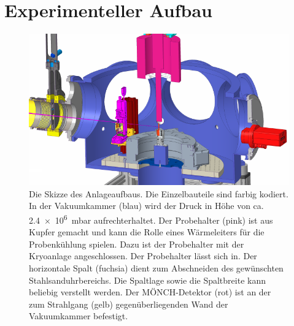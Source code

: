 \chapter{Experimenteller Aufbau}
\begin{figure}[H]
    \centering
    \includegraphics{images/aufbau/aufbau_empty.pdf}
    \caption{Die Skizze des Anlageaufbaus. Die Einzelbauteile sind farbig kodiert. In der Vakuumkammer (blau) wird der Druck in Höhe von ca. \SI{2.4e6}{\milli\bar} aufrechterhaltet. Der Probehalter (pink) ist aus Kupfer gemacht und kann die Rolle eines Wärmeleiters für die Probenkühlung spielen. Dazu ist der Probehalter mit der Kryoanlage angeschlossen. Der Probehalter lässt sich in. Der horizontale Spalt (fuchsia) dient zum Abschneiden des gewünschten Stahlsanduhrbereichs. Die Spaltlage sowie die Spaltbreite kann beliebig verstellt werden. Der MÖNCH-Detektor (rot) ist an der zum Strahlgang (gelb) gegenüberliegenden Wand der Vakuumkammer befestigt.}
    \label{fig:anlage}
\end{figure}